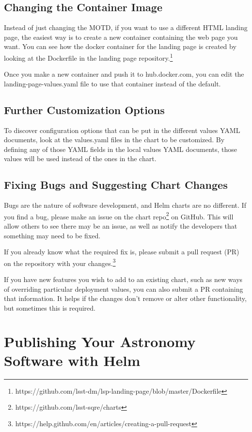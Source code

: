 \documentclass[11pt,twoside]{article}
\begin{document}
\subsection{Changing the Container Image}

Instead of just changing the MOTD, if you want to use a different HTML landing page,
the easiest way is to create a new container containing the web page you want.  You can
see how the docker container for the landing page is created by looking at the
Dockerfile in the landing page repository.\footnote{
https://github.com/lsst-dm/lsp-landing-page/blob/master/Dockerfile}

Once you make a new container and push it to hub.docker.com, you can edit the
landing-page-values.yaml file to use that container instead of the default.

\subsection{Further Customization Options}

To discover configuration options that can be put in the different values YAML
documents, look at the values.yaml files in the chart to be customized.  By defining
any of those YAML fields in the local values YAML documents, those values will be used
instead of the ones in the chart.

\subsection{Fixing Bugs and Suggesting Chart Changes}

Bugs are the nature of software development, and Helm charts are no different.  If you
find a bug, please make an issue on the chart repo\footnote{https://github.com/lsst-sqre/charts}
on GitHub.  This will allow others to see there may be an issue, as well as notify the
developers that something may need to be fixed.

If you already know what the required fix is, please submit a pull request (PR)
on the repository with your changes.\footnote{
https://help.github.com/en/articles/creating-a-pull-request}

If you have new features you wish to add to an existing chart, such as new ways of overriding
particular deployment values, you can also submit a PR containing that information.  It helps
if the changes don't remove or alter other functionality, but sometimes this is required.

\section{Publishing Your Astronomy Software with Helm}
\end{document}
